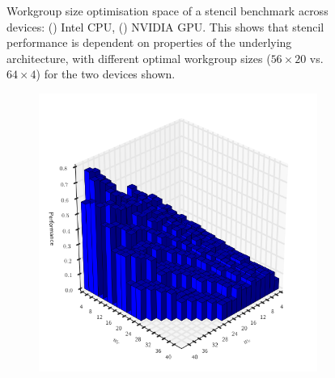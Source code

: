 \begin{figure}
\begin{subfigure}[h]{.49\textwidth}
\vspace{-1.5em} %
\caption{}
\label{fig:motivation-2}
\end{subfigure}
\caption[Workgroup size optimisation space across devices]{%
  Workgroup size optimisation space of a stencil benchmark across
  devices: () Intel CPU,
  () NVIDIA GPU. This shows that stencil
  performance is dependent on properties of the underlying
  architecture, with different optimal workgroup sizes ($56 \times 20$
  vs.\ $64 \times 4$) for the two devices shown.%
}
\label{fig:motivation-arch}
\end{figure}

\begin{figure}
\begin{subfigure}[h]{.49\textwidth}
\centering
\includegraphics[width=1.0\textwidth]{img/motivation_3}
\vspace{-1.5em} %
\caption{}
\label{fig:motivation-3}
\end{subfigure}
~%
\begin{subfigure}[h]{.49\textwidth}
\centering

\end{subfigure}
\end{figure}
